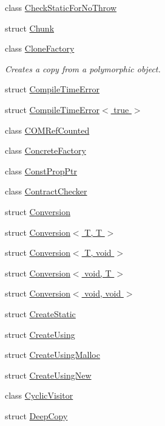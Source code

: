 \begin{DoxyCompactItemize}
\item 
class \hyperlink{classLoki_1_1CheckStaticForNoThrow}{Check\+Static\+For\+No\+Throw}
\item 
struct \hyperlink{classLoki_1_1Chunk}{Chunk}
\item 
class \hyperlink{classLoki_1_1CloneFactory}{Clone\+Factory}
\begin{DoxyCompactList}\small\item\em Creates a copy from a polymorphic object. \end{DoxyCompactList}\item 
struct \hyperlink{structLoki_1_1CompileTimeError}{Compile\+Time\+Error}
\item 
struct \hyperlink{structLoki_1_1CompileTimeError_3_01true_01_4}{Compile\+Time\+Error$<$ true $>$}
\item 
class \hyperlink{classLoki_1_1COMRefCounted}{C\+O\+M\+Ref\+Counted}
\item 
class \hyperlink{classLoki_1_1ConcreteFactory}{Concrete\+Factory}
\item 
class \hyperlink{structLoki_1_1ConstPropPtr}{Const\+Prop\+Ptr}
\item 
class \hyperlink{classLoki_1_1ContractChecker}{Contract\+Checker}
\item 
struct \hyperlink{structLoki_1_1Conversion}{Conversion}
\item 
struct \hyperlink{structLoki_1_1Conversion_3_01T_00_01T_01_4}{Conversion$<$ T, T $>$}
\item 
struct \hyperlink{structLoki_1_1Conversion_3_01T_00_01void_01_4}{Conversion$<$ T, void $>$}
\item 
struct \hyperlink{structLoki_1_1Conversion_3_01void_00_01T_01_4}{Conversion$<$ void, T $>$}
\item 
struct \hyperlink{structLoki_1_1Conversion_3_01void_00_01void_01_4}{Conversion$<$ void, void $>$}
\item 
struct \hyperlink{structLoki_1_1CreateStatic}{Create\+Static}
\item 
struct \hyperlink{structLoki_1_1CreateUsing}{Create\+Using}
\item 
struct \hyperlink{structLoki_1_1CreateUsingMalloc}{Create\+Using\+Malloc}
\item 
struct \hyperlink{structLoki_1_1CreateUsingNew}{Create\+Using\+New}
\item 
class \hyperlink{classLoki_1_1CyclicVisitor}{Cyclic\+Visitor}
\item 
struct \hyperlink{structLoki_1_1DeepCopy}{Deep\+Copy}
\item 

\end{DoxyCompactItemize}
